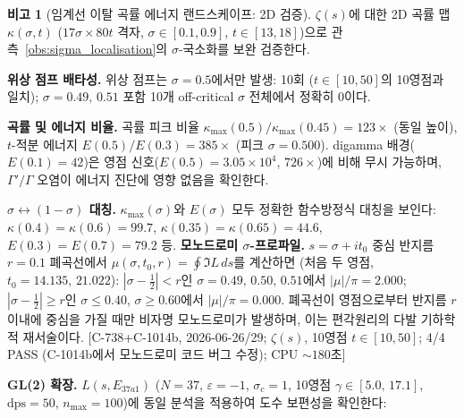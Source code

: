 \documentclass[11pt, a4paper]{article}
\theoremstyle{definition}
\newtheorem{remark}{비고}[section]
\theoremstyle{plain}
\begin{document}
\begin{remark}[임계선 이탈 곡률 에너지 랜드스케이프: 2D 검증]
\label{rem:energy_landscape_2d}
$\zeta(s)$에 대한 2D 곡률 맵 $\kappa(\sigma,t)$
($17\sigma\times80t$ 격자, $\sigma\in[0.1,0.9]$, $t\in[13,18]$)으로
관측~\ref{obs:sigma_localisation}의 $\sigma$-국소화를 보완 검증한다.

\smallskip\noindent
\textbf{위상 점프 배타성.}\;
위상 점프는 $\sigma=0.5$에서만 발생: 10회
($t\in[10,50]$의 10영점과 일치);
$\sigma=0.49,\,0.51$ 포함 10개 off-critical $\sigma$ 전체에서 정확히 0이다.

\smallskip\noindent
\textbf{곡률 및 에너지 비율.}\;
곡률 피크 비율 $\kappa_{\max}(0.5)/\kappa_{\max}(0.45)=123\times$ (동일 높이),
$t$-적분 에너지 $E(0.5)/E(0.3) = 385\times$ (피크 $\sigma=0.500$).
digamma 배경($E(0.1)=42$)은
영점 신호($E(0.5)=3.05\times10^4$, $726\times$)에 비해 무시 가능하며,
$\Gamma'/\Gamma$ 오염이 에너지 진단에 영향 없음을 확인한다.

\smallskip\noindent
\textbf{$\sigma\leftrightarrow(1\!-\!\sigma)$ 대칭.}\;
$\kappa_{\max}(\sigma)$와 $E(\sigma)$ 모두 정확한
함수방정식 대칭을 보인다:
$\kappa(0.4)=\kappa(0.6)=99.7$,
$\kappa(0.35)=\kappa(0.65)=44.6$,
$E(0.3)=E(0.7)=79.2$ 등.
\smallskip\noindent
\textbf{모노드로미 $\sigma$-프로파일.}\;
$s=\sigma+it_0$ 중심 반지름 $r=0.1$ 폐곡선에서
$\mu(\sigma,t_0,r)=\oint\Im L\,ds$를 계산하면 (처음 두 영점,
$t_0=14.135,\,21.022$):
$|\sigma-\tfrac{1}{2}|<r$인 $\sigma=0.49,\,0.50,\,0.51$에서
$|\mu|/\pi=2.000$;
$|\sigma-\tfrac{1}{2}|\ge r$인 $\sigma\le0.40$, $\sigma\ge0.60$에서
$|\mu|/\pi=0.000$.
폐곡선이 영점으로부터 반지름 $r$ 이내에 중심을 가질 때만
비자명 모노드로미가 발생하며,
이는 편각원리의 다발 기하학적 재서술이다.
[C-738+C-1014b, 2026-06-26/29; $\zeta(s)$, 10영점
$t{\in}[10,50]$; 4/4 PASS
(C-1014b에서 모노드로미 코드 버그 수정); CPU ${\sim}180$초]

\smallskip\noindent
\textbf{GL(2) 확장.}\;
$L(s, E_{37a1})$ ($N=37$, $\varepsilon=-1$, $\sigma_c=1$,
10영점 $\gamma\in[5.0,\,17.1]$, $\mathrm{dps}=50$, $n_{\max}=100$)에
동일 분석을 적용하여 도수 보편성을 확인한다:


\end{remark}
\end{document}
